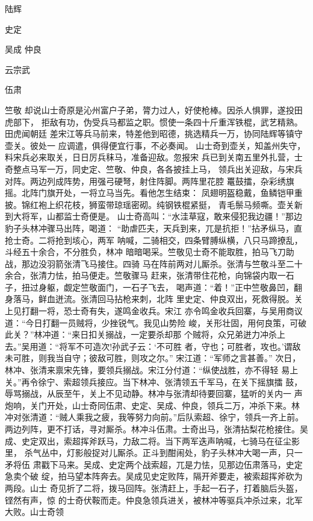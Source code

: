 陆辉

史定

吴成
仲良

云宗武

伍肃

竺敬
却说山士奇原是沁州富户子弟，膂力过人，好使枪棒。因杀人惧罪，遂投田虎部下，
拒敌有功，伪受兵马都监之职。惯使一条四十斤重浑铁棍，武艺精熟。田虎闻朝廷
差宋江等兵马前来，特差他到昭德，挑选精兵一万，协同陆辉等镇守壶关。彼处一
应调遣，俱得便宜行事，不必奏闻。
山士奇到壶关，知盖州失守，料宋兵必来取关，日日厉兵秣马，准备迎敌。忽报宋
兵已到关南五里外扎营，士奇整点马军一万，同史定、竺敬、仲良，各各披挂上马，
领兵出关迎敌，与宋兵对阵。两边列成阵势，用强弓硬弩，射住阵脚。两阵里花腔
鼍鼓擂，杂彩绣旗摇。北阵门旗开处，一将立马当先。看他怎生结束：
凤翅明盔稳戴，鱼鳞铠甲重披。锦红袍上织花枝，狮蛮带琼瑶密砌。纯钢铁棍紧挺，
青毛鬃马频嘶。壶关新到大将军，山都监士奇便是。
山士奇高叫：“水洼草寇，敢来侵犯我边疆！”那边豹子头林冲骤马出阵，喝道：
“助虐匹夫，天兵到来，兀是抗拒！”拈矛纵马，直抢士奇。二将抢到垓心，两军
呐喊，二骑相交，四条臂膊纵横，八只马蹄撩乱，斗经五十余合，不分胜负，林冲
暗暗喝采。竺敬见士奇不能取胜，拍马飞刀助战，那边没羽箭张清飞马接住。四骑
马在阵前两对儿厮杀。张清与竺敬斗至二十余合，张清力怯，拍马便走。竺敬骤马
赶来，张清带住花枪，向锦袋内取一石子，扭过身躯，觑定竺敬面门，一石子飞去，
喝声道：“着！”正中竺敬鼻凹，翻身落马，鲜血迸流。张清回马拈枪来刺，北阵
里史定、仲良双出，死救得脱。关上见打翻一将，恐士奇有失，遂鸣金收兵。宋江
亦令鸣金收兵回寨，与吴用商议道：“今日打翻一员贼将，少挫锐气。我见山势险
峻，关形壮固，用何良策，可破此关？”林冲道：“来日扣关搦战，一定要杀却那
个贼将，众兄弟迸力冲杀上去。”吴用道：“将军不可造次!孙武子云：‘不可胜
者，守也；可胜者，攻也。’谓敌未可胜，则我当自守；彼敌可胜，则攻之尔。”
宋江道：“军师之言甚善。”
次日，林冲、张清来禀宋先锋，要领兵搦战。宋江分付道：“纵使战胜，亦不得轻
易上关。”再令徐宁、索超领兵接应。当下林冲、张清领五千军马，在关下摇旗擂
鼓，辱骂搦战，从辰至午，关上不见动静。林冲与张清却待要回寨，猛听的关内一
声炮响，关门开处，山士奇同伍肃、史定、吴成、仲良，领兵二万，冲杀下来。林
冲对张清道：“贼人乘我之疲，我等努力向前。”后队索超、徐宁，领兵一齐上前。
两边列阵，更不打话，寻对厮杀。林冲斗伍肃。士奇出马，张清拈梨花枪接住。吴
成、史定双出，索超挥斧跃马，力敌二将。当下两军迭声呐喊，七骑马在征尘影里，
杀气丛中，灯影般捉对儿厮杀。正斗到酣闹处，豹子头林冲大喝一声，只一矛将伍
肃戳下马来。吴成、史定两个战索超，兀是力怯，见那边伍肃落马，史定急卖个破
绽，拍马望本阵奔去。吴成见史定败阵，隔开斧要走，被索超挥斧砍为两段。山士
奇见折了二将，拨马回阵。张清赶上，手起一石子，打着脑后头盔，铿然有声，惊
的士奇伏鞍而走。仲良急领兵进关，被林冲等驱兵冲杀过来，北军大败。山士奇领
